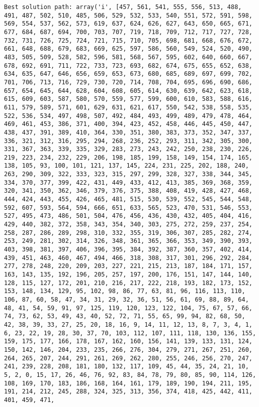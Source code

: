 \documentclass[11pt]{article}
\begin{document}
\begin{Verbatim}[commandchars=\\\{\}]
Best solution path: array('i', [457, 561, 541, 555, 556, 513, 488, 491, 487, 502, 510, 485, 506, 529, 532, 533, 540, 551, 572, 591, 598, 569, 554, 537, 562, 573, 619, 637, 624, 626, 627, 643, 650, 665, 671, 677, 684, 687, 694, 700, 703, 707, 719, 718, 709, 712, 717, 727, 728, 732, 731, 726, 725, 724, 721, 715, 710, 705, 698, 681, 668, 676, 672, 661, 648, 688, 679, 683, 669, 625, 597, 586, 560, 549, 524, 520, 490, 483, 505, 509, 528, 582, 596, 581, 568, 567, 595, 602, 640, 660, 667, 678, 692, 691, 711, 722, 733, 723, 693, 682, 674, 675, 655, 652, 638, 634, 635, 647, 646, 656, 659, 653, 673, 680, 685, 689, 697, 699, 702, 701, 706, 713, 716, 729, 730, 720, 714, 708, 704, 695, 696, 690, 686, 657, 654, 645, 644, 628, 604, 608, 605, 614, 630, 639, 642, 623, 618, 615, 609, 603, 587, 580, 570, 559, 577, 599, 600, 610, 583, 588, 616, 611, 579, 589, 571, 601, 629, 631, 621, 617, 550, 542, 538, 558, 535, 522, 536, 534, 497, 498, 507, 492, 484, 493, 499, 489, 479, 478, 464, 469, 461, 453, 386, 371, 400, 394, 423, 452, 458, 446, 445, 450, 447, 438, 437, 391, 389, 410, 364, 330, 351, 380, 383, 373, 352, 347, 337, 336, 321, 312, 316, 295, 294, 268, 236, 252, 293, 311, 342, 305, 300, 331, 367, 363, 339, 335, 329, 283, 273, 243, 242, 250, 238, 230, 226, 219, 223, 234, 232, 229, 206, 198, 185, 199, 158, 149, 154, 174, 165, 138, 105, 93, 100, 101, 121, 137, 145, 224, 231, 225, 202, 188, 240, 263, 290, 309, 322, 333, 323, 315, 297, 299, 328, 327, 338, 344, 345, 334, 370, 377, 399, 422, 431, 449, 433, 412, 413, 385, 369, 368, 359, 320, 341, 350, 362, 346, 379, 376, 375, 388, 408, 419, 428, 427, 468, 444, 424, 443, 455, 426, 465, 481, 515, 530, 539, 552, 545, 544, 548, 592, 607, 593, 564, 594, 666, 651, 633, 565, 523, 470, 531, 546, 553, 527, 495, 473, 486, 501, 504, 476, 456, 436, 430, 432, 405, 404, 416, 429, 440, 382, 372, 358, 343, 354, 340, 303, 275, 272, 259, 237, 254, 258, 287, 286, 289, 298, 310, 332, 355, 319, 306, 307, 285, 282, 274, 253, 249, 281, 302, 314, 326, 348, 361, 365, 366, 353, 349, 390, 393, 403, 398, 381, 397, 406, 396, 395, 384, 392, 387, 360, 357, 402, 414, 439, 451, 463, 460, 467, 494, 466, 318, 308, 317, 301, 296, 292, 284, 277, 278, 248, 220, 209, 203, 227, 221, 215, 213, 187, 184, 171, 157, 163, 143, 135, 192, 196, 205, 257, 197, 200, 176, 151, 147, 144, 140, 128, 115, 127, 172, 201, 210, 216, 217, 222, 218, 193, 182, 173, 152, 153, 148, 134, 129, 95, 102, 98, 86, 77, 63, 81, 96, 116, 113, 110, 106, 87, 60, 58, 47, 34, 31, 29, 32, 36, 51, 56, 61, 69, 88, 89, 64, 48, 41, 54, 59, 91, 97, 125, 119, 120, 123, 122, 104, 75, 67, 57, 66, 74, 73, 62, 53, 49, 43, 40, 52, 72, 71, 55, 65, 99, 94, 82, 68, 50, 42, 38, 39, 33, 27, 25, 20, 18, 16, 9, 14, 11, 12, 13, 8, 7, 3, 4, 1, 6, 23, 22, 19, 28, 30, 37, 70, 103, 112, 107, 111, 118, 130, 136, 155, 159, 175, 177, 166, 178, 167, 162, 160, 156, 141, 139, 133, 131, 124, 150, 142, 146, 204, 233, 235, 266, 276, 304, 279, 271, 267, 251, 260, 264, 265, 207, 244, 291, 261, 269, 262, 280, 255, 246, 256, 270, 247, 241, 239, 228, 208, 181, 180, 132, 117, 109, 45, 44, 35, 24, 21, 10, 5, 2, 0, 15, 17, 26, 46, 76, 92, 83, 84, 78, 79, 80, 85, 90, 114, 126, 108, 169, 170, 183, 186, 168, 164, 161, 179, 189, 190, 194, 211, 195, 191, 214, 212, 245, 288, 324, 325, 313, 356, 374, 418, 425, 442, 411, 401, 459, 471, 
\end{Verbatim}
\end{document}
